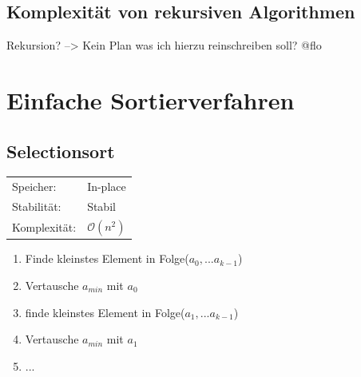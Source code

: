 \documentclass[12pt,a4paper]{article}
\begin{document}
\subsection{Komplexität von rekursiven Algorithmen}
Rekursion? --> Kein Plan was ich hierzu reinschreiben soll? @flo

\section{Einfache Sortierverfahren}
\subsection{Selectionsort}
\begin{tabularx}{\textwidth}{l l}
	Speicher: &In-place\\
	Stabilität: &Stabil\\
	Komplexität: &$\mathcal{O}(n^2)$\\
\end{tabularx}
\vspace{.8cm}
\newline
\begin{minipage}[c]{0.7\textwidth}
	\begin{enumerate}
		\item Finde kleinstes Element in Folge($a_0, ...a_{k-1}$)
		\item Vertausche $a_{min}$ mit $a_0$
		\item finde kleinstes Element in Folge($a_1, ...a_{k-1}$)
		\item Vertausche $a_{min}$ mit $a_1$
		\item ...
	\end{enumerate}
\end{minipage}
\end{document}
